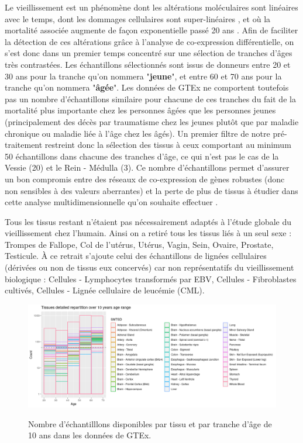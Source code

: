 Le vieillissement est un phénomène dont les altérations moléculaires sont linéaires avec le temps, dont les dommages cellulaires sont super-linéaires \cite{Todhunter2018}, et où la mortalité associée augmente de façon exponentielle passé 20 ans \cite{Finch2016}. Afin de faciliter la détection de ces altérations grâce à l'analyse de co-expression différentielle, on s'est donc dans un premier temps concentré sur une sélection de tranches d'âges très contrastées. Les échantillons sélectionnés sont issus de donneurs entre 20 et 30 ans pour la tranche qu'on nommera "\textbf{jeune}", et entre 60 et 70 ans pour la tranche qu'on nommera "\textbf{âgée}". Les données de GTEx ne comportent toutefois pas un nombre d'échantillons similaire pour chacune de ces tranches du fait de la mortalité plus importante chez les personnes âgées que les personnes jeunes (principalement des décès par traumatisme chez les jeunes plutôt que par maladie chronique ou maladie liée à l'âge chez les âgés). Un premier filtre de notre pré-traitement restreint donc la sélection des tissus à ceux comportant au minimum 50 échantillons dans chacune des tranches d'âge, ce qui n'est pas le cas de la Vessie (20) et le Rein - Médulla (3). Ce nombre d'échantillons permet d'assurer un bon compromis entre des réseaux de co-expression de gènes robustes (donc non sensibles à des valeurs aberrantes) et la perte de plus de tissus à étudier dans cette analyse multidimensionnelle qu'on souhaite effectuer \cite{Liesecke2019}.

Tous les tissus restant n'étaient pas nécessairement adaptés à l'étude globale du vieillissement chez l'humain. Ainsi on a retiré tous les tissus liés à un seul sexe : Trompes de Fallope, Col de l'utérus, Utérus, Vagin, Sein, Ovaire, Prostate, Testicule. À ce retrait s'ajoute celui des échantillons de lignées cellulaires (dérivées ou non de tissus eux concervés) car non représentatifs du vieillissement biologique : Cellules - Lymphocytes transformés par EBV, Cellules - Fibroblastes cultivés, Cellules - Lignée cellulaire de leucémie (CML). 


\begin{figure}[h]
    \centering
    \includegraphics[width=1\textwidth]{img/chap2/chap2_sample_count_by_tissu.png}
    \label{figure:sample_count_by_tissu}
    \caption{Nombre d'échantilllons disponibles par tissu et par tranche d'âge de 10 ans dans les données de GTEx.}
\end{figure}



